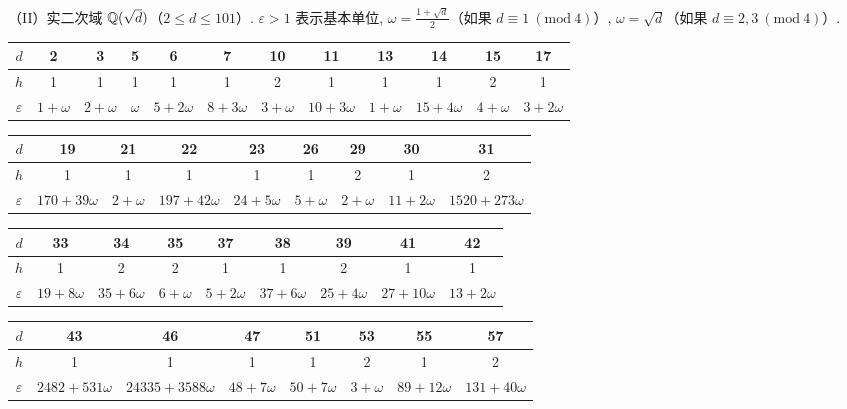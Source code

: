 （II）实二次域 $\mathbb{Q}(\sqrt{d})$（$2\leqslant d\leqslant 101$）. $\varepsilon>1$ 表示基本单位, $\omega=\frac{1+\sqrt{d}}{2}$（如果 $d\equiv 1\ (\mathrm{mod}\ 4)$）, $\omega=\sqrt{d}$（如果 $d\equiv 2,3\ (\mathrm{mod}\ 4)$）.

\begin{center}
\begin{tabular}{|c|ccccccccccc|}
\hline
$d$ & 2 & 3 & 5 & 6 & 7 & 10 & 11 & 13 & 14 & 15 & 17 \\
\hline
$h$ & 1 & 1 & 1 & 1 & 1 & 2 & 1 & 1 & 1 & 2 & 1 \\
\hline
$\varepsilon$ & $1+\omega$ & $2+\omega$ & $\omega$ & $5+2\omega$ & $8+3\omega$ & $3+\omega$ & $10+3\omega$ & $1+\omega$ & $15+4\omega$ & $4+\omega$ & $3+2\omega$ \\
\hline
\end{tabular}
\end{center}

\begin{center}
\begin{tabular}{|c|cccccccc|}
\hline
$d$ & 19 & 21 & 22 & 23 & 26 & 29 & 30 & 31 \\
\hline
$h$ & 1 & 1 & 1 & 1 & 1 & 2 & 1 & 2 \\
\hline
$\varepsilon$ & $170+39\omega$ & $2+\omega$ & $197+42\omega$ & $24+5\omega$ & $5+\omega$ & $2+\omega$ & $11+2\omega$ & $1520+273\omega$ \\
\hline
\end{tabular}
\end{center}

\begin{center}
\begin{tabular}{|c|cccccccc|}
\hline
$d$ & 33 & 34 & 35 & 37 & 38 & 39 & 41 & 42 \\
\hline
$h$ & 1 & 2 & 2 & 1 & 1 & 2 & 1 & 1 \\
\hline
$\varepsilon$ & $19+8\omega$ & $35+6\omega$ & $6+\omega$ & $5+2\omega$ & $37+6\omega$ & $25+4\omega$ & $27+10\omega$ & $13+2\omega$ \\
\hline
\end{tabular}
\end{center}

\begin{center}
\begin{tabular}{|c|ccccccc|}
\hline
$d$ & 43 & 46 & 47 & 51 & 53 & 55 & 57 \\
\hline
$h$ & 1 & 1 & 1 & 1 & 2 & 1 & 2 \\
\hline
$\varepsilon$ & $2482+531\omega$ & $24335+3588\omega$ & $48+7\omega$ & $50+7\omega$ & $3+\omega$ & $89+12\omega$ & $131+40\omega$ \\
\hline
\end{tabular}
\end{center}

